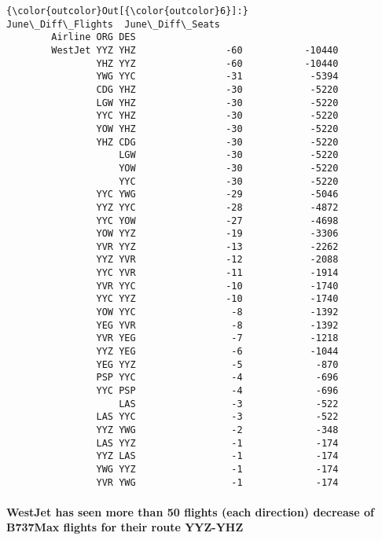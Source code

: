 \documentclass[11pt]{article}
\begin{document}
\begin{Verbatim}[commandchars=\\\{\}]
{\color{outcolor}Out[{\color{outcolor}6}]:}                  June\_Diff\_Flights  June\_Diff\_Seats
        Airline ORG DES                                    
        WestJet YYZ YHZ                -60           -10440
                YHZ YYZ                -60           -10440
                YWG YYC                -31            -5394
                CDG YHZ                -30            -5220
                LGW YHZ                -30            -5220
                YYC YHZ                -30            -5220
                YOW YHZ                -30            -5220
                YHZ CDG                -30            -5220
                    LGW                -30            -5220
                    YOW                -30            -5220
                    YYC                -30            -5220
                YYC YWG                -29            -5046
                YYZ YYC                -28            -4872
                YYC YOW                -27            -4698
                YOW YYZ                -19            -3306
                YVR YYZ                -13            -2262
                YYZ YVR                -12            -2088
                YYC YVR                -11            -1914
                YVR YYC                -10            -1740
                YYC YYZ                -10            -1740
                YOW YYC                 -8            -1392
                YEG YVR                 -8            -1392
                YVR YEG                 -7            -1218
                YYZ YEG                 -6            -1044
                YEG YYZ                 -5             -870
                PSP YYC                 -4             -696
                YYC PSP                 -4             -696
                    LAS                 -3             -522
                LAS YYC                 -3             -522
                YYZ YWG                 -2             -348
                LAS YYZ                 -1             -174
                YYZ LAS                 -1             -174
                YWG YYZ                 -1             -174
                YVR YWG                 -1             -174
\end{Verbatim}
            
    \paragraph{WestJet has seen more than 50 flights (each direction)
decrease of B737Max flights for their route
YYZ-YHZ}\label{westjet-has-seen-more-than-50-flights-each-direction-decrease-of-b737max-flights-for-their-route-yyz-yhz}
\end{document}
